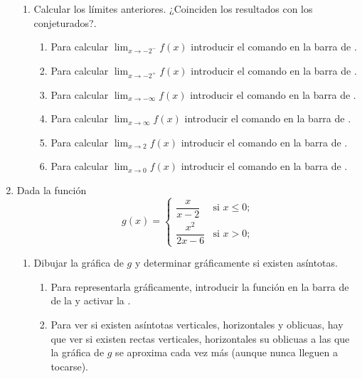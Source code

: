 \begin{enumerate}[leftmargin=*]
\begin{enumerate}
      \item Calcular los límites anteriores. ¿Coinciden los resultados con los conjeturados?.
            \begin{indication}
            \begin{enumerate}
            \item Para calcular $\lim_{x\rightarrow -2^-} f(x)$ introducir el comando  en la barra de .
            \item Para calcular $\lim_{x\rightarrow -2^+} f(x)$ introducir el comando  en la barra de .
            \item Para calcular $\lim_{x\rightarrow -\infty} f(x)$ introducir el comando  en la barra de .
            \item Para calcular $\lim_{x\rightarrow \infty} f(x)$ introducir el comando  en la barra de .
            \item Para calcular $\lim_{x\rightarrow 2} f(x)$ introducir el comando  en la barra de .
            \item Para calcular $\lim_{x\rightarrow 0} f(x)$ introducir el comando  en la barra de .
            \end{enumerate}
            \end{indication}
      \end{enumerate}

\item Dada la función
      \[
      g(x)=
      \begin{cases}
      \dfrac{x}{x-2}    & \mbox{si $x\leq 0$;} \\
      \dfrac{x^2}{2x-6} & \mbox{si $x>0$;}
      \end{cases}
      \]
      \begin{enumerate}
      \item Dibujar la gráfica de $g$ y determinar gráficamente si existen asíntotas.
            \begin{indication}
            \begin{enumerate}
            \item Para representarla gráficamente, introducir la función  en la barra de  de la  y activar la .
            \item Para ver si existen asíntotas verticales, horizontales y oblicuas, hay que ver si existen rectas verticales, horizontales su oblicuas a las que la gráfica de $g$ se aproxima cada vez más (aunque nunca lleguen a tocarse).
            \end{enumerate}
            \end{indication}


\end{enumerate}
\end{enumerate}
